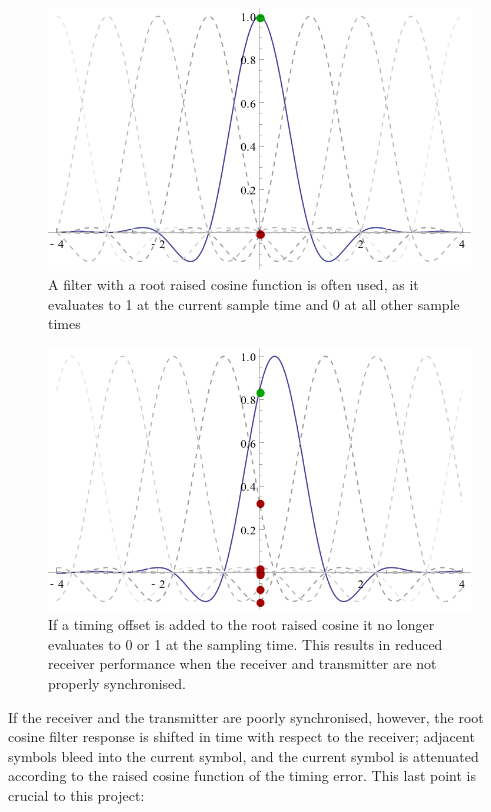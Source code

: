 \begin{figure}[htbp]
\centering
\includegraphics[width=\linewidth]{rrc_sync.png}
\caption[Synchronized raised-cosine response]{A filter with a root raised cosine function is often used, as
it evaluates to 1 at the current sample time and 0 at all other sample
times}
\end{figure}

\begin{figure}[htbp]
\centering
\includegraphics[width=\linewidth]{rrc_err.png}
\caption[Unsynchronized raised-cosine response]{If a timing offset is added to the root raised cosine it no
longer evaluates to 0 or 1 at the sampling time. This results in
reduced receiver performance when the receiver and transmitter are not
properly synchronised.}
\end{figure}

If the receiver and the transmitter are poorly synchronised, however,
the root cosine filter response is shifted in time with respect to the
receiver; adjacent symbols bleed into the current symbol, and the current symbol is attenuated according to the raised cosine function of the timing error. This last point is crucial to this project:

